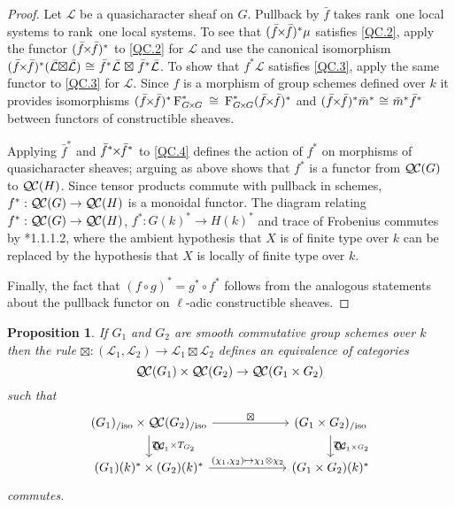 \documentclass{amsart}
\theoremstyle{plain}
\newtheorem{proposition}[theorem]{Proposition}
\theoremstyle{definition}
\theoremstyle{remark}
\newcommand{\Fq}{k}
\newcommand{\Frob}[1]{\operatorname{F}_{#1}}
\newcommand{\iso}{{\ \cong\ }}
\newcommand{\TrFrob}[1]{T_{#1}}
\newcommand{\qcs}[1]{{\mathcal{#1}}}
\newcommand{\gqcs}[1]{{\mathcal{\bar #1}}}
\newcommand{\QC}{{\mathcal{Q\hskip-0.8pt C}}}
\newcommand{\QCiso}[1]{\QC(#1)_{/\text{iso}}}
\renewcommand{\bf}{\bar{f}}
\newcommand{\bm}{\bar{m}}
\newcommand{\tight}[3]{\hspace{-#1pt}{#2}\hspace{-#3pt}}
\newcommand{\bfxf}{\text{$\bar{f} \tight{1}{\times}{1} \bar{f}$}}
\newcommand{\GxxG}{\text{$G \tight{1}{\times}{1} G$}}
\newcommand{\LxL}{\text{$\gqcs{L} \tight{0}{\boxtimes}{0} \gqcs{L}$}}
\begin{document}
\begin{proof}
  Let $\qcs{L}$ be a quasicharacter sheaf on $G$. 
  Pullback by $\bf$ takes rank~one local systems to rank~one local systems.
  To see that $(\bfxf)^* \mu$ satisfies \ref{QC.2},
  apply the functor $(\bfxf)^*$
  to \ref{QC.2} for $\qcs{L}$ and use the canonical isomorphism
  $(\bfxf)^*(\LxL) \iso \bf^*\gqcs{L} \tight{-3}{\boxtimes}{-3} \bf^*\gqcs{L}$.
  To show that $f^*\qcs{L}$ satisfies
  \ref{QC.3}, apply the same functor to \ref{QC.3} for $\qcs{L}$.
  Since $f$ is a morphism of group schemes defined over $\Fq$
  it provides isomorphisms $(\bfxf)^*\Frob{\GxxG}^* \iso \Frob{\GxxG}^* (\bfxf)^*$
  and $(\bfxf)^* \bm^*\iso \bm^* \bf^*$ between functors of constructible sheaves.

  Applying $\bf^*$ and $\bf^* \tight{1}{\times}{1}\bf^*$ to \ref{QC.4} defines the action
  of $f^*$ on morphisms of quasicharacter sheaves; arguing as above shows that $f^*$ is
  a functor from $\QC(G)$ to $\QC(H)$.  Since tensor products commute with pullback in schemes,
  $f^* : \QC(G) \to \QC(H)$ is a monoidal functor.
  The diagram relating $f^* : \QC(G) \to \QC(H)$, $f^* : G(k)^* \to H(k)^*$ and trace of Frobenius
  commutes by \cite{laumon:87a}*{1.1.1.2}, where the ambient
  hypothesis that $X$ is of finite type over $\Fq$ can be replaced by
  the hypothesis that $X$ is locally of finite type over $\Fq$.

  Finally, the fact that $(f\circ g)^* = g^* \circ f^*$ follows from the analogous
  statements about the pullback functor on $\ell$-adic constructible sheaves.
\end{proof}


\begin{proposition}\label{prop:product}
If $G_1$ and $G_2$ are smooth commutative group schemes over $\Fq$ then the rule
$\boxtimes : (\qcs{L}_1,\qcs{L}_2)\to \qcs{L}_1\boxtimes\qcs{L}_2$ defines an equivalence of categories
\[
\QC(G_1)\times \QC(G_2) \to \QC(G_1\times G_2)
\]
such that
\[
\begin{tikzcd}[column sep=60]
\arrow{d}{\TrFrob{G_1} \times \TrFrob{G_2}} \QCiso{G_1}\times \QCiso{G_2} \arrow{r}{\boxtimes}
& \arrow{d}{\TrFrob{G_1\times G_2}} \QCiso{G_1\times G_2}\\
(G_1)(\Fq)^*\times (G_2)(\Fq)^* \arrow{r}{(\chi_1,\chi_2)\mapsto \chi_1\otimes \chi_2}  & (G_1\times G_2)(\Fq)^*
\end{tikzcd}
\]
commutes.
\end{proposition}
\end{document}
